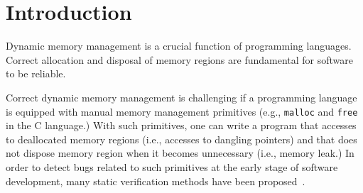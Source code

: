 \section{Introduction}
\label{sec:introduction}

Dynamic memory management is a crucial function of programming
languages.  Correct allocation and disposal of memory regions are
fundamental for software to be reliable.


Correct dynamic memory management is challenging if a programming
language is equipped with manual memory management primitives (e.g.,
\texttt{malloc} and \texttt{free} in the C language.)  With such
primitives, one can write a program that accesses to deallocated
memory regions (i.e., accesses to dangling pointers) and that does not
dispose memory region when it becomes unnecessary (i.e., memory leak.)
In order to detect bugs related to such primitives at the early stage
of software development, many static verification methods have been
proposed~\cite{DBLP:conf/aplas/SuenagaK09,DBLP:conf/pldi/HeineL03,DBLP:conf/sigsoft/XieA05,DBLP:journals/scp/SwamyHMGJ06,DBLP:conf/sas/OrlovichR06,DBLP:conf/issta/SuiYX12}.

